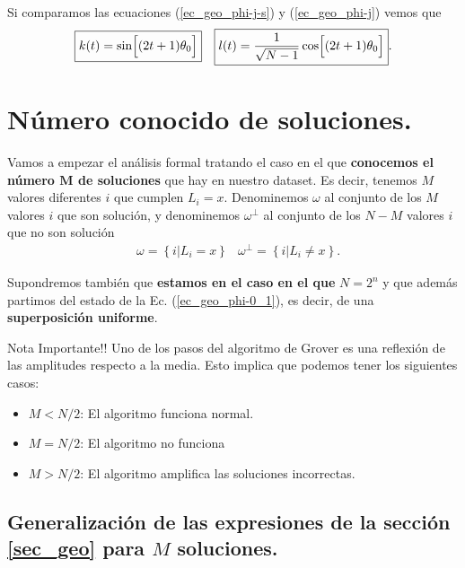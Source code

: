 \documentclass[a4paper,11pt]{book} %
\numberwithin{equation}{chapter}
\def\lch{\left\{}
\def\rch{\right\}}
\def\Lc{\Bigl[}
\def\Rc{\Bigr]}
\begin{document}
Si comparamos las ecuaciones (\ref{ec_geo_phi-j-s}) y (\ref{ec_geo_phi-j}) vemos que
\begin{equation}  \label{ec_geo_sin-cos}
\begin{aligned}
& \boxed{k(t) = \sin \Lc (2t+1) \theta_0 \Rc}
& \boxed{l(t) = \frac{1}{\sqrt{N-1}}\cos \Lc (2t+1) \theta_0 \Rc}.
\end{aligned}
\end{equation}




\section{Número conocido de soluciones.} \label{sec_t-sols}

Vamos a empezar el análisis formal tratando el caso en el que \textbf{conocemos el número $\bm M$ de soluciones} que hay en nuestro dataset. Es decir, tenemos $M$ valores diferentes $i$ que cumplen $L_i=x$. Denominemos $\omega$ al conjunto de los $M$ valores $i$ que son solución, y denominemos $\omega^\perp$ al conjunto de los $N-M$ valores $i$ que no son solución
\begin{equation} 
\begin{aligned}
& \boxed{\omega = \lch i | L_{i} = x \rch }
& \boxed{\omega^{\perp} = \lch i | L_{i} \neq x \rch}.
\end{aligned}
\end{equation}

Supondremos también que \textbf{estamos en el caso en el que} $N = 2^n$ y que además partimos del estado de la Ec. (\ref{ec_geo_phi-0_1}), es decir, de una \textbf{superposición uniforme}. 

	\begin{mybox_blue}{Nota Importante!!}
	Uno de los pasos del algoritmo de Grover es una reflexión de las amplitudes respecto a la media. 
	Esto implica que podemos tener los siguientes casos:
	\begin{itemize}
		\item $M < N/2$: El algoritmo funciona normal.
		
		\item $M = N/2$: El algoritmo no funciona
		
		\item $M > N/2$: El algoritmo amplifica las soluciones incorrectas.
	\end{itemize}
	\end{mybox_blue}

\subsection{Generalización de las expresiones de la sección \ref{sec_geo} para $M$ soluciones.}
\end{document}
